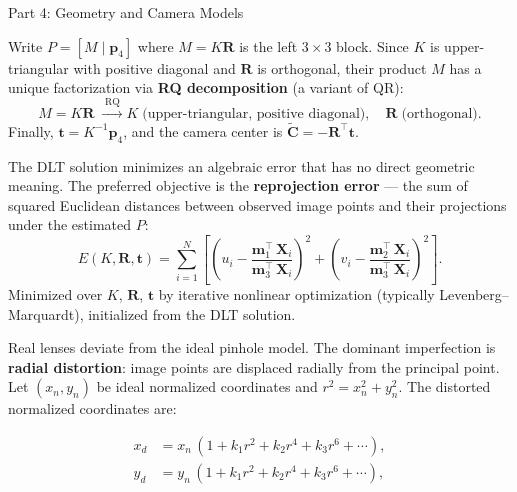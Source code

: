 \documentclass[letterpaper]{article}
\begin{document}
\begin{notes}{Part 4: Geometry and Camera Models}

Write $P = [M \mid \mathbf{p}_4]$ where $M = K\mathbf{R}$ is the
left $3\times 3$ block.  Since $K$ is upper-triangular with positive
diagonal and $\mathbf{R}$ is orthogonal, their product $M$ has a unique
factorization via \textbf{RQ decomposition} (a variant of QR):
\begin{equation}
  M = K\mathbf{R}
  \;\xrightarrow{\;\text{RQ}\;}
  K \;\text{(upper-triangular, positive diagonal)},\quad
  \mathbf{R} \;\text{(orthogonal)}.
\end{equation}
Finally, $\mathbf{t} = K^{-1}\mathbf{p}_4$, and the camera center is
$\widetilde{\mathbf{C}} = -\mathbf{R}^\top\mathbf{t}$.



The DLT solution minimizes an algebraic error that has no direct geometric
meaning.  The preferred objective is the \textbf{reprojection error} ---
the sum of squared Euclidean distances between observed image points and
their projections under the estimated $P$:
\begin{equation}
  E(K,\mathbf{R},\mathbf{t}) = \sum_{i=1}^{N}
      \left[
        \left(u_i - \frac{\mathbf{m}_1^\top\,\mathbf{X}_i}
                         {\mathbf{m}_3^\top\,\mathbf{X}_i}\right)^{\!2}
        +
        \left(v_i - \frac{\mathbf{m}_2^\top\,\mathbf{X}_i}
                         {\mathbf{m}_3^\top\,\mathbf{X}_i}\right)^{\!2}
      \right].
\end{equation}
Minimized over $K$, $\mathbf{R}$, $\mathbf{t}$ by iterative nonlinear
optimization (typically Levenberg--Marquardt), initialized from the DLT
solution.


Real lenses deviate from the ideal pinhole model.  The dominant
imperfection is \textbf{radial distortion}: image points are displaced
radially from the principal point.  Let $(x_n, y_n)$ be ideal normalized
coordinates and $r^2 = x_n^2 + y_n^2$.  The distorted normalized coordinates are:

\begin{align}
    x_d &= x_n\,(1 + k_1 r^2 + k_2 r^4 + k_3 r^6 + \cdots),\\
    y_d &= y_n\,(1 + k_1 r^2 + k_2 r^4 + k_3 r^6 + \cdots),
\end{align}


\end{notes}
\end{document}
